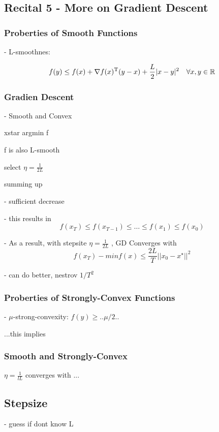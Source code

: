 \subsection{Recital  5 - More on Gradient Descent}

\subsubsection{Proberties of Smooth Functions}

- L-smoothnes:

\[f(y)\le f(x)+\nabla f(x)^{\textnormal{\scriptsize T}}(y-x) +\frac{L}{2}|x-y|^2 \quad \forall x,y \in \mathbb{R}^{}\]

\subsubsection{Gradien Descent}

- Smooth and Convex

xstar argmin f

f is also L-smooth

select $\eta = \frac{1}{2L}$

summing up

- sufficient decrease

- this results in
$$ f(x_T)\le f(x_{T-1})\le \dots \le f(x_1)\le f(x_0)$$

- As a result, with stepsite $\eta = \frac{1}{2L}$
, GD Converges with
$$ f(x_T)-minf(x)\le \frac{2L}{T} ||x_0-x^\star||^2 $$

- can do better, nestrov $1/T^2$

\subsubsection{Proberties of Strongly-Convex Functions}

- $\mu$-strong-convexity: $f(y)\ge ..\mu/2 ..$

...this implies

\subsubsection{Smooth and Strongly-Convex}

$\eta = \frac{1}{lL}$ converges with ...


\subsection{Stepsize}

- guess if dont know L

